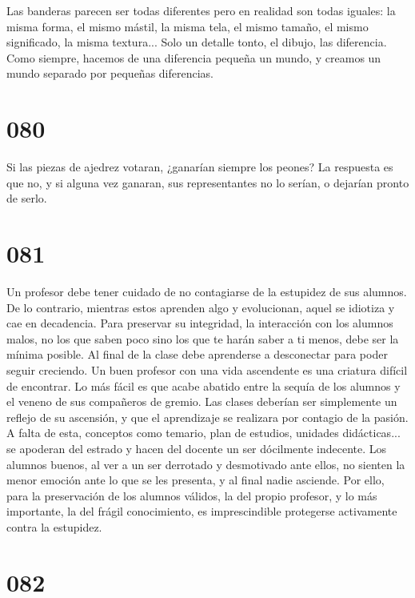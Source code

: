 \documentclass[a4paper,11pt,openright,twocolumn]{book}
\begin{document}
Las banderas parecen ser todas diferentes pero en realidad son todas iguales: la misma forma, el mismo 
mástil, la misma tela, el mismo tamaño, el mismo significado, la misma textura... Solo un detalle tonto, el dibujo, las
diferencia. Como siempre, hacemos de una diferencia pequeña un mundo, y creamos un mundo separado por pequeñas diferencias. 


\section*{080}

Si las piezas de ajedrez votaran, ¿ganarían siempre los peones? La respuesta es que no, y si alguna
vez ganaran, sus representantes no lo serían, o dejarían pronto de serlo. 

\section*{081}

Un profesor debe tener cuidado de no contagiarse de la estupidez de sus alumnos. De lo contrario, mientras estos
aprenden algo y evolucionan, aquel se idiotiza y cae en decadencia. Para preservar su integridad, la interacción con
los alumnos malos, no los que saben poco sino los que te harán saber a ti menos, debe ser la mínima posible. Al final
de la clase debe aprenderse a desconectar para poder seguir creciendo. Un buen profesor con una vida ascendente
es una criatura difícil de encontrar. Lo más fácil es que acabe abatido entre la sequía de los alumnos y el
veneno de sus compañeros de gremio. Las clases deberían ser simplemente un reflejo de su ascensión, y que 
el aprendizaje se realizara por contagio de la pasión. A falta de esta, conceptos como temario, plan de estudios,
unidades didácticas... se apoderan del estrado y hacen del docente un ser dócilmente indecente. Los alumnos buenos,
al ver a un ser derrotado y desmotivado ante ellos, no sienten la menor emoción ante lo que se les presenta, y al final 
nadie asciende. Por ello, para la preservación de los alumnos válidos, la del propio profesor, y lo más importante,
la del frágil conocimiento, es imprescindible protegerse activamente contra la estupidez. 

\section*{082}
\end{document}
